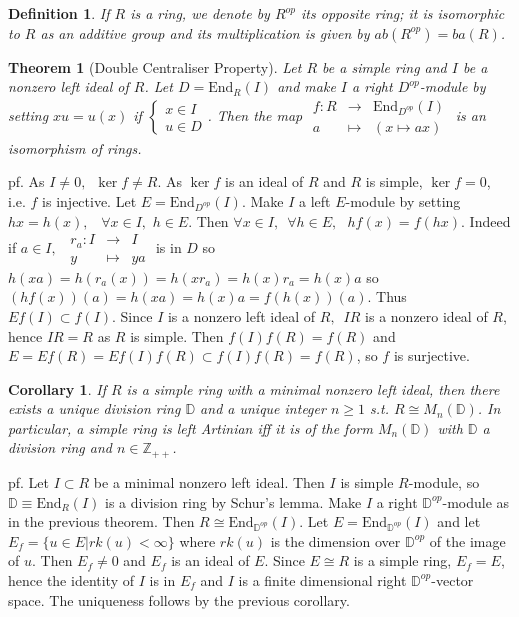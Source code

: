 \documentclass[12pt,letterpaper]{report}
\newtheorem{definition}{Definition}[section]
\newtheorem{theorem}{Theorem}[section]
\newtheorem{corollary}{Corollary}[section]
\begin{document}
\begin{definition}If $R$ is a ring, we denote by $R^{op}$ its opposite ring; it is isomorphic to $R$ as an additive group and its multiplication is given by $ab(R^{op})=ba(R)$.\end{definition}
\begin{theorem}[Double Centraliser Property]Let $R$ be a simple ring and $I$ be a nonzero left ideal of $R$. Let $D=\text{End}_{R}(I)$ and make $I$ a right $D^{op}$-module by setting $xu=u(x)$ if $\left\{\begin{array}{r}x\in I\\u\in D\end{array}\right.$. Then the map $\begin{array}{rrr}f:R&\rightarrow&\text{End}_{D^{op}}(I)\\a&\mapsto&(x\mapsto ax)\end{array}$ is an isomorphism of rings.\end{theorem}
pf. As $I\neq0,\,\,\,\ker f\neq R$. As $\ker f$ is an ideal of $R$ and $R$ is simple, $\ker f=0$, i.e. $f$ is injective. Let $E=\text{End}_{D^{op}}(I)$. Make $I$ a left $E$-module by setting $hx=h(x),\,\,\,\,\,\forall x\in I,\,\,h\in E$. Then $\forall x\in I,\,\,\,\forall h\in E,\,\,\,\,hf(x)=f(hx)$. Indeed if $a\in I,\,\,\,\begin{array}{rrr}r_{a}:I&\rightarrow&I\\y&\mapsto&ya\end{array}$ is in $D$ so $h(xa)=h(r_{a}(x))=h(xr_{a})=h(x)r_{a}=h(x)a$ so $(hf(x))(a)=h(xa)=h(x)a=f(h(x))(a)$. Thus $Ef(I)\subset f(I)$. Since $I$ is a nonzero left ideal of $R,\,\,\,IR$ is a nonzero ideal of $R$, hence $IR=R$ as $R$ is simple. Then $f(I)f(R)=f(R)$ and $E=Ef(R)=Ef(I)f(R)\subset f(I)f(R)=f(R)$, so $f$ is surjective. 
\begin{corollary}If $R$ is a simple ring with a minimal nonzero left ideal, then there exists a unique division ring $\mathbb{D}$ and a unique integer $n\geq1$ s.t. $R\cong M_{n}(\mathbb{D})$. In particular, a simple ring is left Artinian iff it is of the form $M_{n}(\mathbb{D})$ with $\mathbb{D}$ a division ring and $n\in\mathbb{Z}_{++}$.\end{corollary}
pf. Let $I\subset R$ be a minimal nonzero left ideal. Then $I$ is simple $R$-module, so $\mathbb{D}\equiv \text{End}_{R}(I)$ is a division ring by Schur's lemma. Make $I$ a right $\mathbb{D}^{op}$-module as in the previous theorem. Then $R\cong \text{End}_{\mathbb{D}^{op}}(I)$. Let $E=\text{End}_{\mathbb{D}^{op}}(I)$ and let $E_{f}=\{u\in E|rk(u)<\infty\}$ where $rk(u)$ is the dimension over $\mathbb{D}^{op}$ of the image of $u$. Then $E_{f}\neq0$ and $E_{f}$ is an ideal of $E$. Since $E\cong R$ is a simple ring, $E_{f}=E$, hence the identity of $I$ is in $E_{f}$ and $I$ is a finite dimensional right $\mathbb{D}^{op}$-vector space. The uniqueness follows by the previous corollary.
\end{document}
